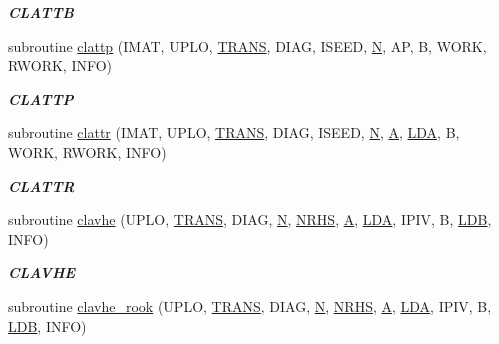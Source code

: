 \begin{DoxyCompactItemize}
\begin{DoxyCompactList}\small\item\em {\bfseries C\+L\+A\+T\+T\+B} \end{DoxyCompactList}\item 
subroutine \hyperlink{group__complex__lin_ga1e90cc5d2961c7b5d9a3c361b853d801}{clattp} (I\+M\+A\+T, U\+P\+L\+O, \hyperlink{superlu__enum__consts_8h_a0c4e17b2d5cea33f9991ccc6a6678d62a1f61e3015bfe0f0c2c3fda4c5a0cdf58}{T\+R\+A\+N\+S}, D\+I\+A\+G, I\+S\+E\+E\+D, \hyperlink{polmisc_8c_a0240ac851181b84ac374872dc5434ee4}{N}, A\+P, B, W\+O\+R\+K, R\+W\+O\+R\+K, I\+N\+F\+O)
\begin{DoxyCompactList}\small\item\em {\bfseries C\+L\+A\+T\+T\+P} \end{DoxyCompactList}\item 
subroutine \hyperlink{group__complex__lin_gaa436960eff44c31efb5816e33474dbd7}{clattr} (I\+M\+A\+T, U\+P\+L\+O, \hyperlink{superlu__enum__consts_8h_a0c4e17b2d5cea33f9991ccc6a6678d62a1f61e3015bfe0f0c2c3fda4c5a0cdf58}{T\+R\+A\+N\+S}, D\+I\+A\+G, I\+S\+E\+E\+D, \hyperlink{polmisc_8c_a0240ac851181b84ac374872dc5434ee4}{N}, \hyperlink{classA}{A}, \hyperlink{example__user_8c_ae946da542ce0db94dced19b2ecefd1aa}{L\+D\+A}, B, W\+O\+R\+K, R\+W\+O\+R\+K, I\+N\+F\+O)
\begin{DoxyCompactList}\small\item\em {\bfseries C\+L\+A\+T\+T\+R} \end{DoxyCompactList}\item 
subroutine \hyperlink{group__complex__lin_ga25d4e26307cae0c5c897051ce64e2e91}{clavhe} (U\+P\+L\+O, \hyperlink{superlu__enum__consts_8h_a0c4e17b2d5cea33f9991ccc6a6678d62a1f61e3015bfe0f0c2c3fda4c5a0cdf58}{T\+R\+A\+N\+S}, D\+I\+A\+G, \hyperlink{polmisc_8c_a0240ac851181b84ac374872dc5434ee4}{N}, \hyperlink{example__user_8c_aa0138da002ce2a90360df2f521eb3198}{N\+R\+H\+S}, \hyperlink{classA}{A}, \hyperlink{example__user_8c_ae946da542ce0db94dced19b2ecefd1aa}{L\+D\+A}, I\+P\+I\+V, B, \hyperlink{example__user_8c_a50e90a7104df172b5a89a06c47fcca04}{L\+D\+B}, I\+N\+F\+O)
\begin{DoxyCompactList}\small\item\em {\bfseries C\+L\+A\+V\+H\+E} \end{DoxyCompactList}\item 
subroutine \hyperlink{group__complex__lin_gaf63f850f9b5f1eec792204240aa90131}{clavhe\+\_\+rook} (U\+P\+L\+O, \hyperlink{superlu__enum__consts_8h_a0c4e17b2d5cea33f9991ccc6a6678d62a1f61e3015bfe0f0c2c3fda4c5a0cdf58}{T\+R\+A\+N\+S}, D\+I\+A\+G, \hyperlink{polmisc_8c_a0240ac851181b84ac374872dc5434ee4}{N}, \hyperlink{example__user_8c_aa0138da002ce2a90360df2f521eb3198}{N\+R\+H\+S}, \hyperlink{classA}{A}, \hyperlink{example__user_8c_ae946da542ce0db94dced19b2ecefd1aa}{L\+D\+A}, I\+P\+I\+V, B, \hyperlink{example__user_8c_a50e90a7104df172b5a89a06c47fcca04}{L\+D\+B}, I\+N\+F\+O)

\end{DoxyCompactItemize}
